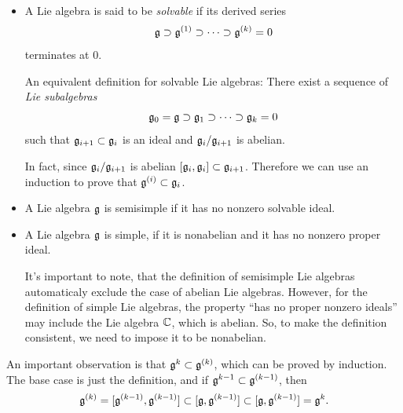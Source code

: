 \begin{itemize}
    
    \item A Lie algebra is said to be \textit{solvable} if its derived series
    \begin{equation}
       \mathfrak{g}\supset \mathfrak{g}^{(1)}\supset\cdots\supset\mathfrak{g}^{(k)}=0
    \end{equation}
    terminates at 0.
    \begin{dang}
        \begin{remark}
            An equivalent definition for solvable Lie algebras: There exist a sequence of \textit{Lie subalgebras} 
            \begin{equation}
                \mathfrak{g}_0=\mathfrak{g}\supset\mathfrak{g}_1\supset\cdots\supset\mathfrak{g}_k=0
            \end{equation}
            such that $\mathfrak{g}_{i+1}\subset\mathfrak{g}_i$ is an ideal and $\mathfrak{g}_i/\mathfrak{g}_{i+1}$ is abelian.
        \end{remark}
    \end{dang}
    In fact, since $\mathfrak{g}_i/\mathfrak{g}_{i+1}$ is abelian $[\mathfrak{g}_i,\mathfrak{g}_i]\subset \mathfrak{g}_{i+1}$. Therefore we can use 
    an induction to prove that $\mathfrak{g}^{(i)}\subset \mathfrak{g}_i$.
    \item A Lie algebra $\mathfrak{g}$ is semisimple if it has no nonzero solvable ideal.
    \item A Lie algebra $\mathfrak{g}$ is simple, if it is nonabelian and it has no nonzero proper ideal.
    \begin{dang}
        \begin{remark}
            It's important to note, that the definition of semisimple Lie algebras automaticaly exclude the case of 
            abelian Lie algebras. However, for the definition of simple Lie algebras, the property 
            ``has no proper nonzero ideals'' may include the Lie algebra $\mathbb{C}$, which is abelian. So, to make the 
            definition consistent, we need to impose it to be nonabelian. 
        \end{remark}
    \end{dang}
\end{itemize}

An important observation is that $\mathfrak{g}^{k}\subset \mathfrak{g}^{(k)}$, which can be proved by induction. 
The base case is just the definition, and if $\mathfrak{g}^{k-1}\subset \mathfrak{g}^{(k-1)}$, then 
\begin{equation}
    \mathfrak{g}^{(k)}=[\mathfrak{g}^{(k-1)},\mathfrak{g}^{(k-1)}]\subset[\mathfrak{g},\mathfrak{g}^{(k-1)}]\subset[\mathfrak{g},\mathfrak{g}^{(k-1)}]=\mathfrak{g}^k.
\end{equation}

